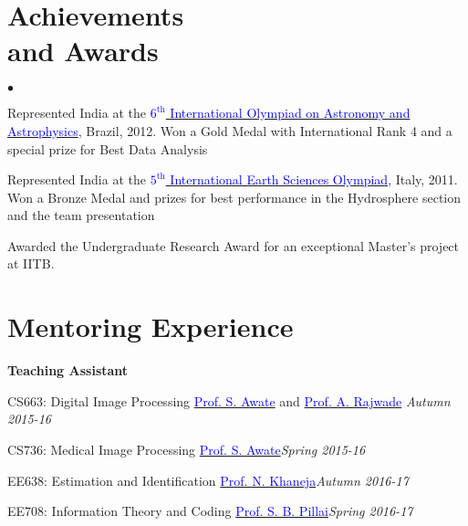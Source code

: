 \documentclass[margin,line]{res}
\newenvironment{list1}{
  \begin{list}{\ding{113}}{%
      \setlength{\itemsep}{0in}
      \setlength{\parsep}{0in} \setlength{\parskip}{0in}
      \setlength{\topsep}{0in} \setlength{\partopsep}{0in} 
      \setlength{\leftmargin}{0.17in}}}{\end{list}}
\newenvironment{list2}{
  \begin{list}{$\bullet$}{%
      \setlength{\itemsep}{0in}
      \setlength{\parsep}{0in} \setlength{\parskip}{0in}
      \setlength{\topsep}{0in} \setlength{\partopsep}{0in} 
      \setlength{\leftmargin}{0.18in}}}{\end{list}}
\begin{document}
\begin{resume}
\section{\sc Achievements \\and Awards}
\begin{list2}
\item Represented India at the \href{http://www.ioaa2012.ufrj.br/}{\textcolor{blue} {$6^\text{th}$ International Olympiad on Astronomy and Astrophysics}}, Brazil, 2012. Won a Gold Medal with International Rank 4 and a special prize for Best Data Analysis
\item Represented India at the \href{http://www.ieso2011.unimore.it/}{\textcolor{blue} {$5^\text{th}$ International Earth Sciences Olympiad}}, Italy, 2011. Won a Bronze Medal and prizes for best performance in the Hydrosphere section and the team presentation
\item Awarded the Undergraduate Research Award for an exceptional Master's project at IITB.
\end{list2}


\section{\sc Mentoring Experience}
\textbf{Teaching Assistant}
\begin{list1}
\item[] CS663: Digital Image Processing \hspace{0.5cm} \href{https://www.cse.iitb.ac.in/~suyash}{\textcolor{blue}{Prof. S. Awate}} and \href{https://www.cse.iitb.ac.in/~ajitvr}{\textcolor{blue}{Prof. A. Rajwade}} \hfill{\textit{Autumn 2015-16}}
\item[] CS736: Medical Image Processing \hspace{2cm} \href{https://www.cse.iitb.ac.in/~suyash}{\textcolor{blue}{Prof. S. Awate}}\hfill{\textit{Spring 2015-16}}
\item[] EE638: Estimation and Identification \hspace{1.25cm} \href{https://www.ee.iitb.ac.in/course/~ee638/Navin}{\textcolor{blue}{Prof. N. Khaneja}}\hfill{\textit{Autumn 2016-17}}
\item[] EE708: Information Theory and Coding \hspace{0.87cm} \href{https://www.ee.iitb.ac.in/wiki/faculty/bsraj}{\textcolor{blue}{Prof. S. B. Pillai}}\hfill{\textit{Spring 2016-17}}
\end{list1}


\end{resume}
\end{document}
